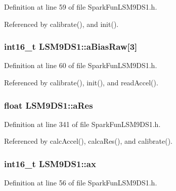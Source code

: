 Definition at line 59 of file Spark\+Fun\+L\+S\+M9\+D\+S1.\+h.



Referenced by calibrate(), and init().

\subsubsection[{\texorpdfstring{a\+Bias\+Raw}{aBiasRaw}}]{\setlength{\rightskip}{0pt plus 5cm}int16\+\_\+t L\+S\+M9\+D\+S1\+::a\+Bias\+Raw\mbox{[}3\mbox{]}}\hypertarget{class_l_s_m9_d_s1_ae42dc2f2b9f2df223c853e233191313a}{}\label{class_l_s_m9_d_s1_ae42dc2f2b9f2df223c853e233191313a}


Definition at line 60 of file Spark\+Fun\+L\+S\+M9\+D\+S1.\+h.



Referenced by calibrate(), init(), and read\+Accel().

\subsubsection[{\texorpdfstring{a\+Res}{aRes}}]{\setlength{\rightskip}{0pt plus 5cm}float L\+S\+M9\+D\+S1\+::a\+Res\hspace{0.3cm}{\ttfamily [protected]}}\hypertarget{class_l_s_m9_d_s1_acdc1f9b300b3c349e17dd21c9bb37c40}{}\label{class_l_s_m9_d_s1_acdc1f9b300b3c349e17dd21c9bb37c40}


Definition at line 341 of file Spark\+Fun\+L\+S\+M9\+D\+S1.\+h.



Referenced by calc\+Accel(), calca\+Res(), and calibrate().

\subsubsection[{\texorpdfstring{ax}{ax}}]{\setlength{\rightskip}{0pt plus 5cm}int16\+\_\+t L\+S\+M9\+D\+S1\+::ax}\hypertarget{class_l_s_m9_d_s1_adac13514d176cfb54aed8cda9a056335}{}\label{class_l_s_m9_d_s1_adac13514d176cfb54aed8cda9a056335}


Definition at line 56 of file Spark\+Fun\+L\+S\+M9\+D\+S1.\+h.



